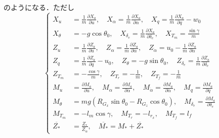 のようになる．ただし
\begin{equation}
	\left\{
	\begin{align}
		X_u &= \frac{1}{m} \frac{\partial X_a}{\partial u},\quad
		X_\alpha = \frac{1}{m} \frac{\partial X_a}{\partial \alpha},\quad
		X_q = \frac{1}{m} \frac{\partial X_a}{\partial q} - w_0 \\[2pt]
		X_\theta &= -g\cos\theta_0,\quad
		X_{\delta_e} = \frac{1}{m} \frac{\partial X_a}{\partial \delta_e},\quad
		X_{T_m} = \frac{\sin\gamma}{m} \\[2pt]
		Z_u &= \frac{1}{m} \frac{\partial Z_a}{\partial u},\quad
		Z_\alpha = \frac{1}{m} \frac{\partial Z_a}{\partial \alpha},\quad
		Z_{\dot{\alpha}} = u_0 - \frac{1}{m} \frac{\partial Z_a}{\partial \dot\alpha} \\[2pt]
		Z_q &= \frac{1}{m} \frac{\partial Z_a}{\partial q} - u_0,\quad
		Z_\theta = -g\sin\theta_0,\quad
		Z_{\delta_e} = \frac{1}{m} \frac{\partial Z_a}{\partial \delta_e} \\[2pt]
		Z_{T_m} &= -\frac{\cos\gamma}{m},\quad
		Z_{T_r} = -\frac{1}{m},\quad
		Z_{T_f} = -\frac{1}{m} \\[2pt]
		M_u &= \frac{\partial M_a}{\partial u},\quad
		M_\alpha = \frac{\partial M_a}{\partial \alpha},\quad
		M_{\dot\alpha} = \frac{\partial M_a}{\partial \dot\alpha},\quad
		M_q = \frac{\partial M_a}{\partial q} \\[2pt]
		M_\theta &= mg(R_{G_x}\sin\theta_0 - R_{G_z}\cos\theta_0),\quad
		M_{\delta_e} = \frac{\partial M_a}{\partial {\delta_e}} \\[2pt]
		M_{T_m} &= -l_m\cos\gamma,\quad
		M_{T_r} = -l_{r_x},\quad
		M_{T_f} = l_f \\[2pt]
		\overline{Z_*} &= \frac{Z_*}{Z_{\dot\alpha}},\quad
		\overline{M_*} = M_* + \overline{Z_*}
	\end{align}
	\label{eq:partial_derivatives}
\end{equation}

